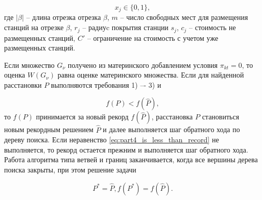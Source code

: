 \begin{displaymath}
    x_j \in \{0, 1\},
\end{displaymath}
где $|\beta|$ -- длина отрезка отрезка  $\beta$, $m$ -- число свободных мест для размещения станций на отрезке $\beta$, $r_j$ -- радиуc покрытия станции $s_j$, $c_j$ -- стоимость не размещенных станций, $C'$ -- ограничение на стоимость с учетом уже размещенных станций.


Если множество $G_\nu$ получено из материнского добавлением условия $\pi_{kt}=0$, то оценка $W(G_\nu)$ равна оценке материнского множества. Если для найденной расстановки $P$ выполняются требования 1) –- 3) и

\begin{equation}
    \label{eq:part4_is_less_than_record}
    f(P) < f(\widehat{P}),
\end{equation}
то $f(P)$ принимается за новый рекорд $f(\widehat{P})$, расстановка $P$ становиться новым рекордным решением $\widehat{P}$ и далее выполняется шаг обратного хода по дереву поиска. Если неравенство \cref{eq:part4_is_less_than_record} не выполняется, то рекорд остается прежним и выполняется шаг обратного хода. Работа алгоритма типа ветвей и границ заканчивается, когда все вершины дерева поиска закрыты, при этом решение задачи 

\begin{displaymath}
    P^{*} = \widehat{P},  f(P^*) = f(\widehat{P}).
\end{displaymath}





